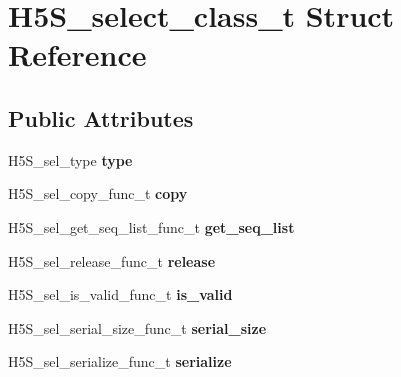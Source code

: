 \hypertarget{struct_h5_s__select__class__t}{}\section{H5\+S\+\_\+select\+\_\+class\+\_\+t Struct Reference}
\label{struct_h5_s__select__class__t}
\subsection*{Public Attributes}
\begin{DoxyCompactItemize}
\item 
\mbox{\label{struct_h5_s__select__class__t_a4f32de6d8283dda9268380b636ee5e6e}} 
H5\+S\+\_\+sel\+\_\+type {\bfseries type}
\item 
\mbox{\label{struct_h5_s__select__class__t_adbc66d52b250e0f56e007dd32a9a8b72}} 
H5\+S\+\_\+sel\+\_\+copy\+\_\+func\+\_\+t {\bfseries copy}
\item 
\mbox{\label{struct_h5_s__select__class__t_a7ffc21b785efc2d861a2e75678253db0}} 
H5\+S\+\_\+sel\+\_\+get\+\_\+seq\+\_\+list\+\_\+func\+\_\+t {\bfseries get\+\_\+seq\+\_\+list}
\item 
\mbox{\label{struct_h5_s__select__class__t_a567640cc4fd1caf640baa8bb5d768c42}} 
H5\+S\+\_\+sel\+\_\+release\+\_\+func\+\_\+t {\bfseries release}
\item 
\mbox{\label{struct_h5_s__select__class__t_ada7da62d7c1ad04dad0976f0d19159d8}} 
H5\+S\+\_\+sel\+\_\+is\+\_\+valid\+\_\+func\+\_\+t {\bfseries is\+\_\+valid}
\item 
\mbox{\label{struct_h5_s__select__class__t_aa8e36c279071dc678e75cb585929140c}} 
H5\+S\+\_\+sel\+\_\+serial\+\_\+size\+\_\+func\+\_\+t {\bfseries serial\+\_\+size}
\item 
\mbox{\label{struct_h5_s__select__class__t_a11fdd77bd00af2a8094fb5bf559a73b0}} 
H5\+S\+\_\+sel\+\_\+serialize\+\_\+func\+\_\+t {\bfseries serialize}
\item 

\end{DoxyCompactItemize}
